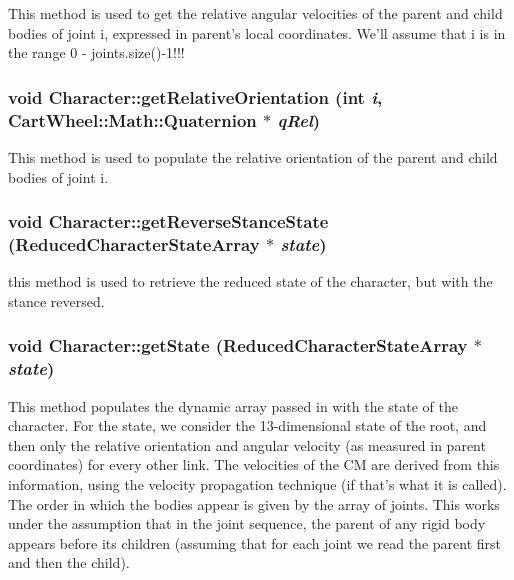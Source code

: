This method is used to get the relative angular velocities of the parent and child bodies of joint i, expressed in parent's local coordinates. We'll assume that i is in the range 0 -\/ joints.size()-\/1!!! \hypertarget{classCartWheel_1_1Core_1_1Character_af0d9094560e80c80fd74c3d51f6bafff}{
\subsubsection[{getRelativeOrientation}]{\setlength{\rightskip}{0pt plus 5cm}void Character::getRelativeOrientation (int {\em i}, \/  {\bf CartWheel::Math::Quaternion} $\ast$ {\em qRel})}}
\label{classCartWheel_1_1Core_1_1Character_af0d9094560e80c80fd74c3d51f6bafff}
This method is used to populate the relative orientation of the parent and child bodies of joint i. \hypertarget{classCartWheel_1_1Core_1_1Character_a158fb4154cc111f834731848dd9ca3d8}{
\subsubsection[{getReverseStanceState}]{\setlength{\rightskip}{0pt plus 5cm}void Character::getReverseStanceState ({\bf ReducedCharacterStateArray} $\ast$ {\em state})}}
\label{classCartWheel_1_1Core_1_1Character_a158fb4154cc111f834731848dd9ca3d8}
this method is used to retrieve the reduced state of the character, but with the stance reversed. \hypertarget{classCartWheel_1_1Core_1_1Character_a690c7d5b7d36bdb1997558ab42bdc917}{
\subsubsection[{getState}]{\setlength{\rightskip}{0pt plus 5cm}void Character::getState ({\bf ReducedCharacterStateArray} $\ast$ {\em state})}}
\label{classCartWheel_1_1Core_1_1Character_a690c7d5b7d36bdb1997558ab42bdc917}
This method populates the dynamic array passed in with the state of the character. For the state, we consider the 13-\/dimensional state of the root, and then only the relative orientation and angular velocity (as measured in parent coordinates) for every other link. The velocities of the CM are derived from this information, using the velocity propagation technique (if that's what it is called). The order in which the bodies appear is given by the array of joints. This works under the assumption that in the joint sequence, the parent of any rigid body appears before its children (assuming that for each joint we read the parent first and then the child).

